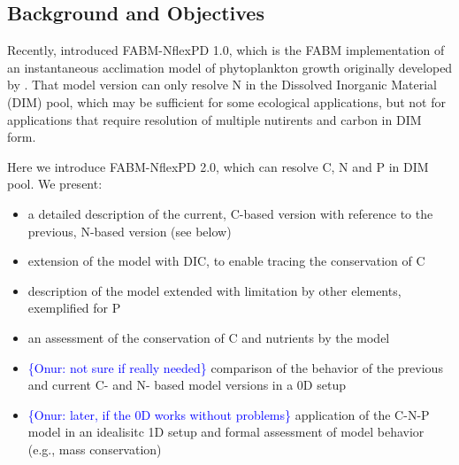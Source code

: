 \documentclass[gmd, manuscript]{copernicus}
\newcommand{\onur}[1]{\textcolor{blue}{\{Onur: #1\}}}
\begin{document}
\subsection{Background and Objectives}
Recently, \citet{Kerimoglu2021} introduced FABM-NflexPD 1.0, which is the FABM \citep[Framework for Aquatic Biogeochemical Models][]{Bruggeman2014} implementation of an instantaneous acclimation model of phytoplankton growth originally developed by \citet{Smith2016}. That model version can only resolve N in the Dissolved Inorganic Material (DIM) pool, which may be sufficient for some ecological applications, %
but not for applications that require resolution of multiple nutirents and carbon in DIM form.

Here we introduce FABM-NflexPD 2.0, which can resolve C, N and P in DIM pool. We present:
\begin{itemize}
 \item a detailed description of the current, C-based version with reference to the previous, N-based version (see below)
 \item extension of the model with DIC, to enable tracing the conservation of C
 \item description of the model extended with limitation by other elements, exemplified for P
 \item an assessment of the conservation of C and nutrients by the model
 \item \onur{not sure if really needed} comparison of the behavior of the previous and current C- and N- based model versions in a 0D setup  %
 \item \onur{later, if the 0D works without problems} application of the C-N-P model in an idealisitc 1D setup and formal assessment of model behavior (e.g., mass conservation)
\end{itemize}

\end{document}
